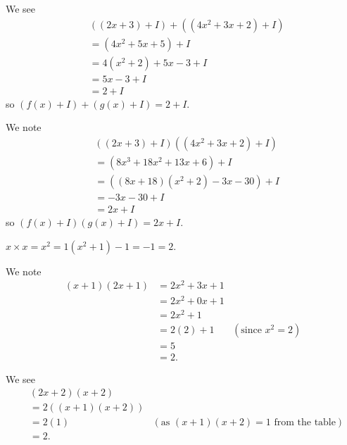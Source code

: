 \begin{questions}
\begin{partquestions}{\roman*}
        \item \begin{partquestions}{\alph*}
            \item We see
            \begin{align*}
                &\left((2x+3) + I\right) + \left((4x^2+3x+2) + I\right)\\
                &= (4x^2+5x+5) + I\\
                &= 4(x^2+2) + 5x - 3 + I\\
                &= 5x - 3 + I\\
                &= 2 + I
            \end{align*}
            so $(f(x) + I) + (g(x) + I) = 2 + I$.

            \item We note
            \begin{align*}
                &((2x+3) + I)((4x^2+3x+2) + I)\\
                &= (8 x^3 + 18 x^2 + 13 x + 6) + I\\
                &= \left((8x + 18)(x^2+2) - 3x - 30\right) + I\\
                &= -3x - 30 + I\\
                &= 2x + I
            \end{align*}
            so $(f(x) + I)(g(x) + I) = 2x + I$.
        \end{partquestions}
    \end{partquestions}

    \item \begin{partquestions}{\alph*}
        \item $x \times x = x^2 = 1(x^2+1) - 1 = -1 = 2$.

        \item We note
        \begin{align*}
            (x+1)(2x+1) &= 2x^2 + 3x + 1\\
            &= 2x^2 + 0x + 1\\
            &= 2x^2 + 1\\
            &= 2(2) + 1 & (\text{since } x^2 = 2)\\
            &= 5\\
            &= 2.
        \end{align*}

        \item We see
        \begin{align*}
            &(2x+2)(x+2)\\
            &= 2\left((x+1)(x+2)\right)\\
            &= 2(1) & (\text{as } (x+1)(x+2) = 1 \text{ from the table})\\
            &= 2.
        \end{align*}


\end{partquestions}
\end{questions}
